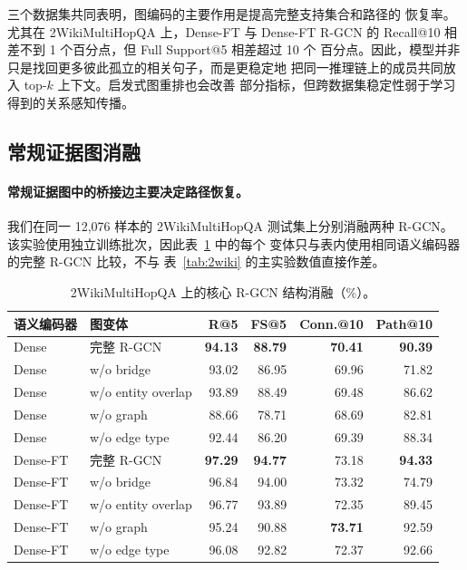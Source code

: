 三个数据集共同表明，图编码的主要作用是提高完整支持集合和路径的
恢复率。尤其在 2WikiMultiHopQA 上，Dense-FT 与 Dense-FT R-GCN 的
Recall@10 相差不到 1 个百分点，但 Full Support@5 相差超过 10 个
百分点。因此，模型并非只是找回更多彼此孤立的相关句子，而是更稳定地
把同一推理链上的成员共同放入 top-$k$ 上下文。启发式图重排也会改善
部分指标，但跨数据集稳定性弱于学习得到的关系感知传播。

\subsection{常规证据图消融}

\paragraph{常规证据图中的桥接边主要决定路径恢复。}
我们在同一 12,076 样本的 2WikiMultiHopQA 测试集上分别消融两种
R-GCN。该实验使用独立训练批次，因此表~\ref{tab:ablation} 中的每个
变体只与表内使用相同语义编码器的完整 R-GCN 比较，不与
表~\ref{tab:2wiki} 的主实验数值直接作差。

\begin{table}[t]
\centering
\small
\setlength{\tabcolsep}{5pt}
\caption{2WikiMultiHopQA 上的核心 R-GCN 结构消融（\%）。}
\label{tab:ablation}
\begin{tabular}{llrrrr}
\hline
语义编码器 & 图变体 & R@5 & FS@5 & Conn.@10 & Path@10 \\
\hline
Dense & 完整 R-GCN & \textbf{94.13} & \textbf{88.79} & \textbf{70.41} & \textbf{90.39} \\
Dense & w/o bridge & 93.02 & 86.95 & 69.96 & 71.82 \\
Dense & w/o entity overlap & 93.89 & 88.49 & 69.48 & 86.62 \\
Dense & w/o graph & 88.66 & 78.71 & 68.69 & 82.81 \\
Dense & w/o edge type & 92.44 & 86.20 & 69.39 & 88.34 \\
\hline
Dense-FT & 完整 R-GCN & \textbf{97.29} & \textbf{94.77} & 73.18 & \textbf{94.33} \\
Dense-FT & w/o bridge & 96.84 & 94.00 & 73.32 & 74.79 \\
Dense-FT & w/o entity overlap & 96.77 & 93.89 & 72.35 & 89.45 \\
Dense-FT & w/o graph & 95.24 & 90.88 & \textbf{73.71} & 92.59 \\
Dense-FT & w/o edge type & 96.08 & 92.82 & 72.37 & 92.66 \\
\hline
\end{tabular}
\end{table}

